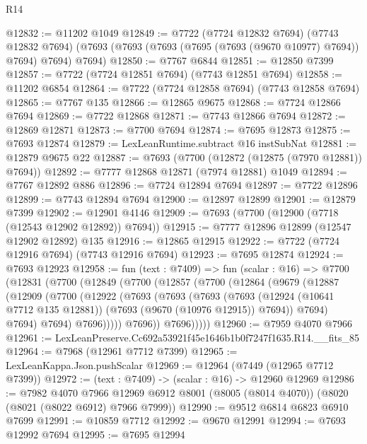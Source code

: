 \begin{lexlean}{R14}
\begin{coremodule}
@12832 := @11202 @1049
@12849 := @7722
    (@7724 @12832 @7694)
    (@7743 @12832 @7694)
    (@7693 (@7693 (@7693 (@7695 (@7693 (@9670 @10977) @7694)) @7694) @7694) @7694)
@12850 := @7767 @6844
@12851 := @12850 @7399
@12857 := @7722 (@7724 @12851 @7694) (@7743 @12851 @7694)
@12858 := @11202 @6854
@12864 := @7722 (@7724 @12858 @7694) (@7743 @12858 @7694)
@12865 := @7767 @135
@12866 := @12865 @9675
@12868 := @7724 @12866 @7694
@12869 := @7722 @12868
@12871 := @7743 @12866 @7694
@12872 := @12869 @12871
@12873 := @7700 @7694
@12874 := @7695 @12873
@12875 := @7693 @12874
@12879 := LexLeanRuntime.subtract @16 instSubNat
@12881 := @12879 @9675 @22
@12887 := @7693 (@7700 (@12872 (@12875 (@7970 @12881)) @7694))
@12892 := @7777 @12868 @12871 (@7974 @12881) @1049
@12894 := @7767 @12892 @886
@12896 := @7724 @12894 @7694
@12897 := @7722 @12896
@12899 := @7743 @12894 @7694
@12900 := @12897 @12899
@12901 := @12879 @7399
@12902 := @12901 @4146
@12909 := @7693 (@7700 (@12900 (@7718 (@12543 @12902 @12892)) @7694))
@12915 := @7777 @12896 @12899 (@12547 @12902 @12892) @135
@12916 := @12865 @12915
@12922 := @7722 (@7724 @12916 @7694) (@7743 @12916 @7694)
@12923 := @7695 @12874
@12924 := @7693 @12923
@12958 := fun (text : @7409) =>
  fun (scalar : @16) =>
  @7700
    (@12831
      (@7700
        (@12849
          (@7700
            (@12857
              (@7700
                (@12864
                  (@9679
                    (@12887
                      (@12909
                        (@7700
                          (@12922
                            (@7693
                              (@7693
                                (@7693
                                  (@7693
                                    (@12924 (@10641 @7712 @135 @12881))
                                    (@7693 (@9670 (@10976 @12915)) @7694))
                                  @7694)
                                @7694)
                              @7694)
                            @7696)))))
                  @7696))
              @7696)))))
@12960 := @7959 @4070 @7966
@12961 := LexLeanPreserve.Cc692a53921f45e1646b1b0f7247f1635.R14.__fits_85
@12964 := @7968 (@12961 @7712 @7399)
@12965 := LexLeanKappa.Json.pushScalar
@12969 := @12964 (@7449 (@12965 @7712 @7399))
@12972 := (text : @7409) -> (scalar : @16) -> @12960 @12969
@12986 := @7982
    @4070
    @7966
    @12969
    @6912
    @8001
    (@8005 (@8014 @4070))
    (@8020 (@8021 (@8022 @6912) @7966 @7999))
@12990 := @9512 @6814 @6823 @6910 @7699
@12991 := @10859 @7712
@12992 := @9670 @12991
@12994 := @7693 @12992 @7694
@12995 := @7695 @12994

\end{coremodule}
\end{lexlean}
